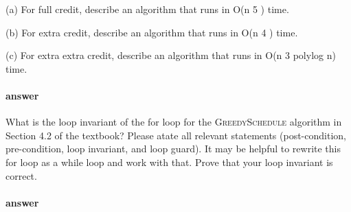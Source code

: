 \documentclass{article}
\begin{document}
(a) For full credit, describe an algorithm that runs in O(n 5 ) time.

(b) For extra credit, describe an algorithm that runs in O(n 4 ) time.

(c) For extra extra credit, describe an algorithm that runs in O(n 3 polylog n)
time.

\paragraph{answer}

\todo{}

\collab{}

What is the loop invariant of the for loop for the \textsc{GreedySchedule}
algorithm in Section 4.2 of the textbook?  Please atate all relevant statements
(post-condition, pre-condition, loop invariant, and loop guard).  It may be
helpful to rewrite this for loop as a while loop and work with that.  Prove that
your loop invariant is correct.

\paragraph{answer}

\todo{}
\end{document}
